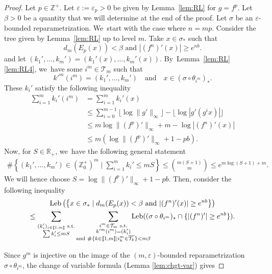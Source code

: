 \documentclass[10pt]{amsart}
\DeclareMathOperator{\Leb}{Leb}
\theoremstyle{definition}
\newcommand{\bbR}{{\mathbb{R}}}
\newcommand{\bbZ}{{\mathbb{Z}}}
\begin{document}
\begin{proof}
Let $p \in \bbZ^+$. Let $\varepsilon := \varepsilon_p > 0$ be given by Lemma~\ref{lem:RL} for $g = f^p$.
Let $\beta > 0$ be a quantity that we will determine at the end of the proof.
Let $\sigma$ be an $\varepsilon$-bounded reparametrization. We~start with the case where $n = mp$.
Consider the tree given by Lemma~\ref{lem:RL} up to level $m$.
Take $x \in \sigma_*$ such that
\[
d_m(E_p(x)) < \beta \text{ and } |(f^n)'(x)| \geq e^{nb}.
\]
and let $(k_1',\dots, k_m') = (k_1'(x),\dots, k_m'(x))$. By~Lemma~\ref{lem:RL}\eqref{lem:RL4}, we~have some $i^m \in \mathcal{T}_m$ such that
\[
k'^m(i^m) = (k_1',\dots, k_m') \quad \text{and} \quad x \in \left (\sigma \circ \theta_{i^m} \right)_*.
\]
These $k_i'$ satisfy the following inequality
\begin{align*}
\sum_{i=1}^m k_i'(i^m)
&= \sum_{i=1}^m k_i'(x)\\
&\leq \sum_{i=0}^{m-1} \lfloor \log \| g' \|_{\infty} \rfloor - \lfloor \log |g'(g^i x)| \rfloor\\
&\leq m \log \| (f^p)' \|_{\infty} + m - \log |(f^n)'(x)|\\
&\leq m \left (\log \| (f^p)'\|_{\infty} + 1 - pb \right).
\end{align*}
Now, for $S \in \bbR_+$, we~have the following general statement
\begin{align}
\# \left \{ (k_1',\dots, k_m') \in (\bbZ_0^+)^m \mid \textstyle\sum_{i = 1}^m k_i' \leq m S \right \} \leq {\binom{m(S+1)} m} \leq e^{m \log (S+1) + m}.
\tag{$*$}
\label{ineq:3-1}
\end{align}
We will hence choose $S = \log \| (f^p)'\|_{\infty} + 1 - pb$. Then, consider the following inequality
\begin{multline*}
\Leb\left (\left \{ x \in \sigma_* \mid d_m(E_p(x)) < \beta \text{ and } | (f^n)'(x) | \geq e^{nb}\right \} \right)\\
\leq \sum_{\substack{(k_i')_{i \in [\![ 1, m ]\!]} \text{ s.t.}\\
\sum k_i' \leq m S}} \sum_{\substack{i^m \in \mathcal{T}_m \text{ s.t.}\\
k'^m(i^m) = (k_i')\\
\text{and } \# \{ k \in [\![ 1, m ]\!] \mid i^m_k \in \overline{\mathcal{T}_k} \} < m \beta}}
\hspace{-10mm}\Leb ((\sigma \circ \theta_{i^m})_* \cap \{ |(f^n)'| \geq e^{nb} \}).
\end{multline*}
\noindent
\begin{minipage}{\textwidth}
Since $g^m$ is injective on the image of the $(m, \varepsilon)$-bounded reparametrization $\sigma \circ \theta_{i^m}$, the change of variable formula (Lemma \ref{lem:chgt-var}) gives

\end{minipage}
\end{proof}
\end{document}
